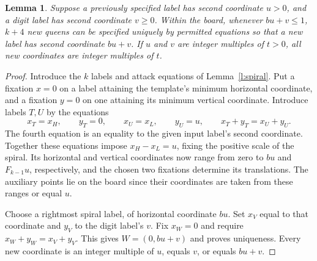 \documentclass[11pt]{article}
\newtheorem{lemma}[theorem]{Lemma}
\begin{document}
\begin{lemma}\label{l:mult}
Suppose a previously specified label has second coordinate $u>0$, and a digit label has second coordinate $v\ge0$. Within the board, whenever $bu+v\le1$, $k+4$ new queens can be specified uniquely by permitted equations so that a new label has second coordinate $bu+v$. If $u$ and $v$ are integer multiples of $t>0$, all new coordinates are integer multiples of $t$.
\end{lemma}
\begin{proof}
Introduce the $k$ labels and attack equations of Lemma~\ref{l:spiral}. Put a fixation $x=0$ on a label attaining the template's minimum horizontal coordinate, and a fixation $y=0$ on one attaining its minimum vertical coordinate. Introduce labels $T,U$ by the equations
\[
 x_T=x_H,\qquad y_T=0,\qquad x_U=x_L,\qquad y_U=u,
 \qquad x_T+y_T=x_U+y_U.
\]
The fourth equation is an equality to the given input label's second coordinate. Together these equations impose $x_H-x_L=u$, fixing the positive scale of the spiral. Its horizontal and vertical coordinates now range from zero to $bu$ and $F_{k-1}u$, respectively, and the chosen two fixations determine its translations. The auxiliary points lie on the board since their coordinates are taken from these ranges or equal $u$.

Choose a rightmost spiral label, of horizontal coordinate $bu$. Set $x_V$ equal to that coordinate and $y_V$ to the digit label's $v$. Fix $x_W=0$ and require $x_W+y_W=x_V+y_V$. This gives $W=(0,bu+v)$ and proves uniqueness. Every new coordinate is an integer multiple of $u$, equals $v$, or equals $bu+v$.
\end{proof}
\end{document}
